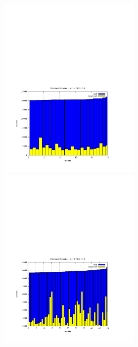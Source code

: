 \documentclass{l4proj}
\begin{document}
\begin{figure}
\begin{center}
\begin{minipage}[t]{0.3\textwidth}
\end{minipage}
\end{center}
\vspace{-4.0cm}
\begin{center}
\hspace{-1.5cm}
\begin{minipage}[t]{0.3\textwidth}
\includegraphics[height=9.0cm]{machInfo-run25-frb35-17-1.pdf}
\end{minipage}
\hfill
\begin{minipage}[t]{0.3\textwidth}
\includegraphics[height=9.0cm]{machInfo-run50-frb35-17-1.pdf}
\end{minipage}
\hfill
\begin{minipage}[t]{0.3\textwidth}

\end{minipage}
\end{center}
\end{figure}
\end{document}

